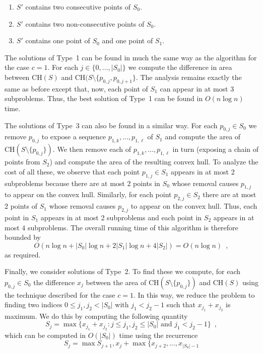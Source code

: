 \documentclass[lotsofwhite]{patmorin}
\newcommand{\ch}{\mathrm{CH}}
\begin{document}
\begin{enumerate}
\item $S'$ contains two consecutive points of $S_0$.
\item $S'$ contains two non-consecutive points of $S_0$.
\item $S'$ contains one point of $S_0$ and one point of $S_1$.
\end{enumerate}

The solutions of Type~1 can be found in much the same way as the
algorithm for the case $c=1$.  For each $j\in\{0,\ldots,|S_0|\}$ we
compute the difference in area between $\ch(S)$ and
$\ch(S\setminus\{p_{0,j},p_{0,j+1}\}$.  The analysis remains exactly
the same as before except that, now, each point of $S_1$ can appear in
at most $3$ subproblems.  Thus, the best solution of Type~1 can be
found in $O(n\log n)$ time.


The solutions of Type~3 can also be found in a similar way.  For each
$p_{0,j}\in S_0$ we remove $p_{0,j}$ to expose a sequence
$p_{1,k},\ldots,p_{1,\ell}$ of $S_1$ and compute the area of
$\ch(S\setminus\{p_{0,j}\})$.  We then remove each of
$p_{1,k},\ldots,p_{1,\ell}$ in turn (exposing a chain of points from
$S_2$) and compute the area of the resulting convex hull.  To analyze
the cost of all these, we observe that each point $p_{1,j}\in S_1$
appears in at most 2 subproblems because there are at most 2 points in
$S_0$ whose removal causes $p_{1,j}$ to appear on the convex hull.
Similarly, for each point $p_{2,j}\in S_2$ there are at most 2 points
of $S_1$ whose removal causes $p_{2,j}$ to appear on the convex hull.
Thus, each point in $S_1$ appears in at most 2 subproblems and each
point in $S_2$ appears in at most $4$ subproblems.  The overall
running time of this algorithm is therefore bounded by
\[
    O\left(n\log n + |S_0|\log n + 2|S_1|\log n + 4|S_2|\right) = O(n\log n) \enspace ,
\]
as required.

Finally, we consider solutions of Type~2.  To find these we compute,
for each $p_{0,j}\in S_0$ the difference $x_j$ between the area of
$\ch(S\setminus\{p_{0,j}\})$ and $\ch(S)$ using the technique
described for the case $c=1$.  In this way, we reduce the problem to
finding two indices $0\le j_1,j_2< |S_0|$ with $j_1<j_2-1$ such that
$x_{j_1}+x_{j_2}$ is maximum.  We do this 
by computing the following quantity 
\[
     S_j = \max\{x_{j_1}+x_{j_2} : 
       \mbox{$j\le j_1,j_2\le |S_0|$ and $j_1 < j_2-1$}\} \enspace ,
\]
which can be computed in $O(|S_0|)$ time using the recurrence
\[
    S_j = \max{S_{j+1}, x_{j} + \max\{x_{j+2}},\ldots,x_{|S_0|-1}
\]
\end{document}
